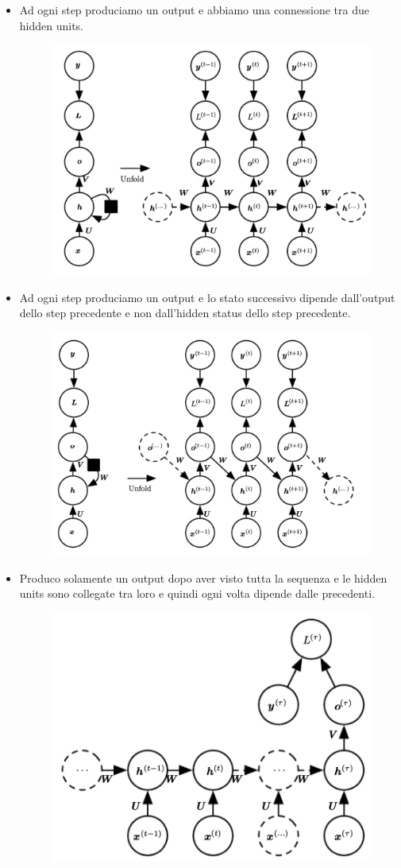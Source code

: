 \documentclass[14pt]{extreport}
\begin{document}
\begin{itemize}
	\item Ad ogni step produciamo un output e abbiamo una connessione tra due hidden units.
	      \begin{figure}[H]
		      \centering
		      \includegraphics[width=0.7\linewidth]{420.jpeg}
	      \end{figure}
	\item Ad ogni step produciamo un output e lo stato successivo dipende dall'output dello step precedente e non dall'hidden status dello step
	precedente.
	      \begin{figure}[H]
		      \centering
		      \includegraphics[width=0.7\linewidth]{421.jpeg}
	      \end{figure}
	\item Produco solamente un output dopo aver visto tutta la sequenza e le hidden units sono collegate tra loro e quindi ogni volta dipende dalle
	precedenti.
	      \begin{figure}[H]
		      \centering
		      \includegraphics[width=0.7\linewidth]{422.jpeg}
	      \end{figure}
\end{itemize}
\end{document}
